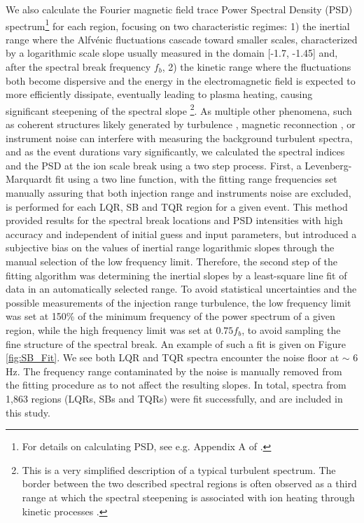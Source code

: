 \documentclass[]{aastex62}
\begin{document}
We also calculate the Fourier magnetic field trace Power Spectral Density (PSD) spectrum\footnote{For details on calculating PSD, see e.g. Appendix A of \cite{Bourouaine_2013}.} for each region, focusing on two characteristic regimes: 1) the inertial range where the Alfv\'enic fluctuations cascade toward smaller scales, characterized by a logarithmic scale slope usually measured in the domain [-1.7, -1.45] \citep{Bruno_2013_LRSP} and, after the spectral break frequency $f_b$,
2) the kinetic range where the fluctuations both become dispersive and the energy in the electromagnetic field is expected to more efficiently dissipate, eventually leading to plasma heating, causing significant steepening of the spectral slope \citep{Alexandrova_2012_ApJ,Verscharen_2019_LRSP}\footnote{This is a very simplified description of a typical turbulent spectrum. The border between the two described spectral regions is often observed as a third range at which the spectral steepening is associated with ion heating through kinetic processes \citep{Sahraoui_2010_PhRvL,Bowen_2020_PhRvL}.}. As multiple other phenomena, such as coherent structures likely generated by turbulence \citep{Lion_2016_ApJ,Howes_2016_ApJ}, magnetic reconnection \citep{Mallet_2017_JPlPh,Loureiro_2017_ApJ,Vech_2018b}, or instrument noise \citep{Martinovic_2019_ApJ} can interfere with measuring the background turbulent spectra, and as the event durations vary significantly, we calculated the spectral indices and the PSD at the ion scale break using a two step process. First, a Levenberg-Marquardt fit using a two line function, with the fitting range frequencies set manually assuring that both injection range and instruments noise are excluded, is performed for each LQR, SB and TQR region for a given event. This method provided results for the spectral break locations and PSD intensities with high accuracy and independent of initial guess and input parameters, but introduced a subjective bias on the values of inertial range logarithmic slopes through the manual selection of the low frequency limit. Therefore, the second step of the fitting algorithm was determining the inertial slopes by a least-square line fit of data in an automatically selected range. To avoid statistical uncertainties and the possible measurements of the injection range turbulence, the low frequency limit was set at 150\% of the minimum frequency of the power spectrum of a given region, while the high frequency limit was set at $0.75 f_b$, to avoid sampling the fine structure of the spectral break. An example of such a fit is given on Figure \ref{fig:SB_Fit}. We see both LQR and TQR spectra encounter the noise floor at $\sim$ 6 Hz. The frequency range contaminated by the noise is manually removed from the fitting procedure as to not affect the resulting slopes. In total, spectra from 1,863 regions (LQRs, SBs and TQRs) were fit successfully, and are included in this study.
\end{document}
